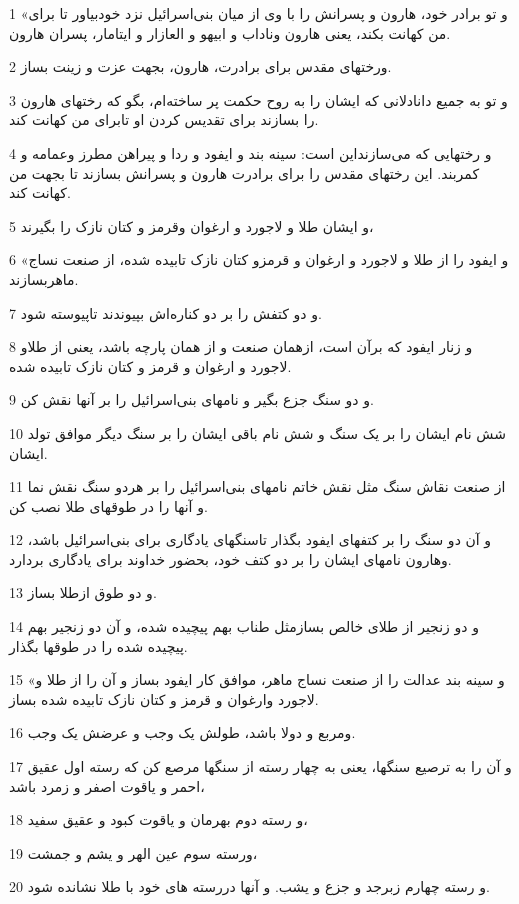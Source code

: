 \par 1 «و تو برادر خود، هارون و پسرانش را با وی از میان بنی‌اسرائیل نزد خودبیاور تا برای من کهانت بکند، یعنی هارون وناداب و ابیهو و العازار و ایتامار، پسران هارون.
\par 2 ورختهای مقدس برای برادرت، هارون، بجهت عزت و زینت بساز.
\par 3 و تو به جمیع دانادلانی که ایشان را به روح حکمت پر ساخته‌ام، بگو که رختهای هارون را بسازند برای تقدیس کردن او تابرای من کهانت کند.
\par 4 و رختهایی که می‌سازنداین است: سینه بند و ایفود و ردا و پیراهن مطرز وعمامه و کمربند. این رختهای مقدس را برای برادرت هارون و پسرانش بسازند تا بجهت من کهانت کند.
\par 5 و ایشان طلا و لاجورد و ارغوان وقرمز و کتان نازک را بگیرند،
\par 6 «و ایفود را از طلا و لاجورد و ارغوان و قرمزو کتان نازک تابیده شده، از صنعت نساج ماهربسازند.
\par 7 و دو کتفش را بر دو کناره‌اش بپیوندند تاپیوسته شود.
\par 8 و زنار ایفود که برآن است، ازهمان صنعت و از همان پارچه باشد، یعنی از طلاو لاجورد و ارغوان و قرمز و کتان نازک تابیده شده.
\par 9 و دو سنگ جزع بگیر و نامهای بنی‌اسرائیل را بر آنها نقش کن.
\par 10 شش نام ایشان را بر یک سنگ و شش نام باقی ایشان را بر سنگ دیگر موافق تولد ایشان.
\par 11 از صنعت نقاش سنگ مثل نقش خاتم نامهای بنی‌اسرائیل را بر هردو سنگ نقش نما و آنها را در طوقهای طلا نصب کن.
\par 12 و آن دو سنگ را بر کتفهای ایفود بگذار تاسنگهای یادگاری برای بنی‌اسرائیل باشد، وهارون نامهای ایشان را بر دو کتف خود، بحضور خداوند برای یادگاری بردارد.
\par 13 و دو طوق ازطلا بساز.
\par 14 و دو زنجیر از طلای خالص بسازمثل طناب بهم پیچیده شده، و آن دو زنجیر بهم پیچیده شده را در طوقها بگذار.
\par 15 «و سینه بند عدالت را از صنعت نساج ماهر، موافق کار ایفود بساز و آن را از طلا و لاجورد وارغوان و قرمز و کتان نازک تابیده شده بساز.
\par 16 ومربع و دولا باشد، طولش یک وجب و عرضش یک وجب.
\par 17 و آن را به ترصیع سنگها، یعنی به چهار رسته از سنگها مرصع کن که رسته اول عقیق احمر و یاقوت اصفر و زمرد باشد،
\par 18 و رسته دوم بهرمان و یاقوت کبود و عقیق سفید،
\par 19 ورسته سوم عین الهر و یشم و جمشت،
\par 20 و رسته چهارم زبرجد و جزع و یشب. و آنها دررسته های خود با طلا نشانده شود.
